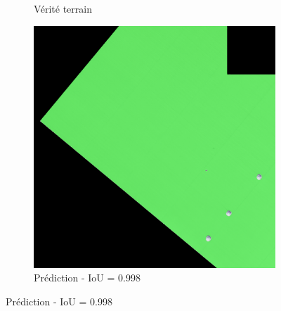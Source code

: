 \begin{figure}[H]
\begin{subfigure}{0.32\textwidth}
    \caption{Vérité terrain}
\end{subfigure}
\hfill
\begin{subfigure}{0.32\textwidth}
    \includegraphics[width=\textwidth]{02-main//figures/ch4/kfold_ensembles/segformer_tu-regnety_080.ra3_in1k/best_cases/best_5_iou0.998_24991116_tile_5_3_322356_overlay_pred.png}
    \caption{Prédiction - IoU = 0.998}
\end{subfigure}

\vspace{0.35cm}


\end{figure}
